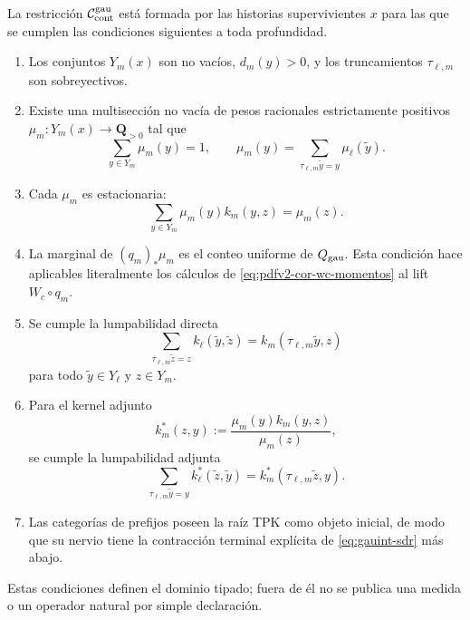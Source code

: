 La restricción \(\mathcal C_{\rm cont}^{\rm gau}\) está formada por las
historias supervivientes \(x\) para las que se cumplen las condiciones
siguientes a toda profundidad.
\begin{enumerate}
 \item Los conjuntos \(Y_m(x)\) son no vacíos, \(d_m(y)>0\), y los
 truncamientos \(\tau_{\ell,m}\) son sobreyectivos.
 \item Existe una multisección no vacía de pesos racionales estrictamente
 positivos \(\mu_m:Y_m(x)\to\mathbf Q_{>0}\) tal que
 \begin{equation}\label{eq:gauint-medida-proyectiva}
  \sum_{y\in Y_m}\mu_m(y)=1,
  \qquad
  \mu_m(y)=\sum_{\tau_{\ell,m}\widetilde y=y}\mu_\ell(\widetilde y).
 \end{equation}
 \item Cada \(\mu_m\) es estacionaria:
 \begin{equation}\label{eq:gauint-estacionariedad}
  \sum_{y\in Y_m}\mu_m(y)k_m(y,z)=\mu_m(z).
 \end{equation}
 \item La marginal de \((q_m)_*\mu_m\) es el conteo uniforme de
 \(Q_{\rm gau}\). Esta condición hace aplicables literalmente los cálculos
 de \eqref{eq:pdfv2-cor-wc-momentos} al lift \(W_c\circ q_m\).
 \item Se cumple la lumpabilidad directa
 \begin{equation}\label{eq:gauint-lump-directa}
  \sum_{\tau_{\ell,m}\widetilde z=z}
   k_\ell(\widetilde y,\widetilde z)
  =k_m(\tau_{\ell,m}\widetilde y,z)
 \end{equation}
 para todo \(\widetilde y\in Y_\ell\) y \(z\in Y_m\).
 \item Para el kernel adjunto
 \begin{equation}\label{eq:gauint-kernel-adjunto}
  k_m^*(z,y):=\frac{\mu_m(y)k_m(y,z)}{\mu_m(z)},
 \end{equation}
 se cumple la lumpabilidad adjunta
 \begin{equation}\label{eq:gauint-lump-adjunta}
  \sum_{\tau_{\ell,m}\widetilde y=y}
   k_\ell^*(\widetilde z,\widetilde y)
  =k_m^*(\tau_{\ell,m}\widetilde z,y).
 \end{equation}
 \item Las categorías de prefijos poseen la raíz TPK como objeto inicial,
 de modo que su nervio tiene la contracción terminal explícita de
 \eqref{eq:gauint-sdr} más abajo.
\end{enumerate}
Estas condiciones definen el dominio tipado; fuera de él no se publica una
medida o un operador natural por simple declaración.

